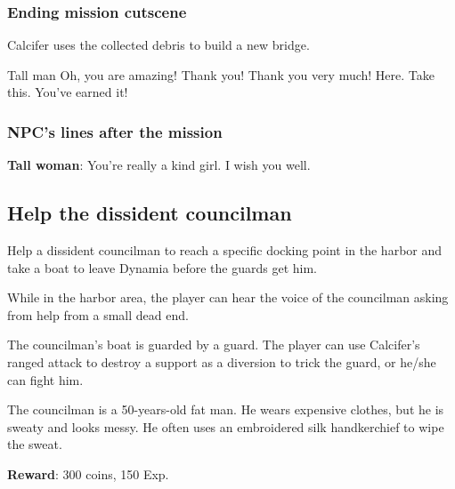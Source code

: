 \subsubsection*{Ending mission cutscene}
\begin{screenplay}

Calcifer uses the collected debris to build a new bridge.

\begin{dialogue}[excited]{Tall man}
Oh, you are amazing! Thank you! Thank you very much! Here. Take this. You've earned it!
\end{dialogue}


\end{screenplay}

\subsubsection*{NPC's lines after the mission}
\textbf{Tall woman}: You're really a kind girl. I wish you well.



\subsection{Help the dissident councilman}
Help a dissident councilman to reach a specific docking point in the harbor and take a boat to leave Dynamia before the guards get him.

While in the harbor area, the player can hear the voice of the councilman asking from help from a small dead end.

The councilman's boat is guarded by a guard. The player can use Calcifer's ranged attack to destroy a support as a diversion to trick the guard, or he/she can fight him.

The councilman is a 50-years-old fat man. He wears expensive clothes, but he is sweaty and looks messy. He often uses an embroidered silk handkerchief to wipe the sweat.

\textbf{Reward}: 300 coins, 150 Exp.

